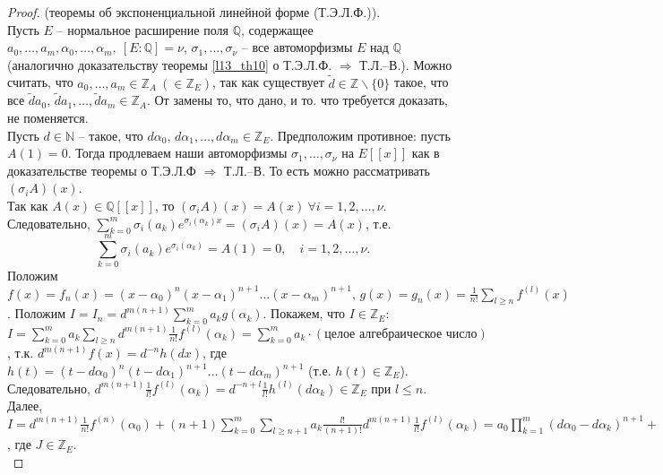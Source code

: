 \begin{proof} (теоремы об экспоненциальной линейной форме (Т.Э.Л.Ф.)).\\
	Пусть $E$ -- нормальное расширение поля $\mathbb{Q}$, содержащее $a_0,\dots,a_m,\alpha_0,\dots,\alpha_m, \ [E \colon \mathbb{Q}] = \nu$, $\sigma_1,\dots,\sigma_\nu$ -- все автоморфизмы $E$ над $\mathbb{Q}$ (аналогично доказательству теоремы \ref{l13_th10} о Т.Э.Л.Ф. $\Rightarrow$ Т.Л.--В.). 
	Можно считать, что $a_0, \dots, a_m \in \mathbb{Z}_A \ (\in \mathbb{Z}_E)$, так как существует $\tilde{d} \in \mathbb{Z} \backslash \{ 0 \}$ такое, что все $\tilde{d}a_0, \, \tilde{d}a_1, \dots, \tilde{d}a_m \in \mathbb{Z}_A$. От замены то, что дано, и то. что требуется доказать, не поменяется.\\
	Пусть $d \in \mathbb{N}$ -- такое, что $d\alpha_0, \, d\alpha_1, \dots, d\alpha_m \in \mathbb{Z}_E$. Предположим противное: пусть $A(1)=0$. Тогда продлеваем наши автоморфизмы $\sigma_1, \dots, \sigma_\nu$ на $E[[x]]$ как в доказательстве теоремы о Т.Э.Л.Ф $\Rightarrow$ Т.Л.--В. То есть можно рассматривать $(\sigma_iA)(x)$.\\
	Так как $A(x) \in \mathbb{Q}[[x]]$, то $(\sigma_iA)(x) = A(x) \ \forall i = 1,2,\dots,\nu$. Следовательно, $\displaystyle \sum\limits_{k=0}^m \sigma_i (a_k) e^{\sigma_i(\alpha_k)x} = (\sigma_iA)(x) = A(x)$, т.е.
	$$\sum\limits_{k=0}^m \sigma_i(a_k)e^{\sigma_i(\alpha_k)} = A(1) = 0, \quad i = 1,2,\dots,\nu.$$
	Положим $\displaystyle f(x) = f_n(x) = (x-\alpha_0)^n(x-\alpha_1)^{n+1}\dots(x-\alpha_m)^{n+1}, \, g(x) = g_n(x) = \frac{1}{n!} \sum\limits_{l \geq n} f^{(l)}(x)$. 
	Положим $\displaystyle I=I_n = d^{m(n+1)} \sum\limits_{k=0}^m a_kg(\alpha_k)$. Покажем, что $I \in \mathbb{Z}_E$:\\
	$\displaystyle I = \sum\limits_{k=0}^m a_k \sum\limits_{l \geq n} d^{m(n+1)}\frac{1}{n!}f^{(l)}(\alpha_k) = \sum\limits_{k=0}^m a_k \cdot (\text{целое алгебраическое число})$, т.к. $d^{m(n+1)}f(x) = d^{-n}h(dx)$, где $h(t) = (t-d\alpha_0)^n(t-d\alpha_1)^{n+1}\dots(t-d\alpha_m)^{n+1}$ (т.е. $h(t) \in \mathbb{Z}_E$). 
	Следовательно, $\displaystyle d^{m(n+1)}\frac{1}{l!}f^{(l)}(\alpha_k) = d^{-n+l}\frac{1}{l!}h^{(l)}(d\alpha_k) \in \mathbb{Z}_E$ при $l \leq n$. Далее,\\
	$\displaystyle I = d^{m(n+1)}\frac{1}{n!}f^{(n)}(\alpha_0) + (n+1)\sum\limits_{k=0}^m\sum\limits_{l \geq n+1} a_k\frac{l!}{(n+1)!}d^{m(n+1)}\frac{1}{l!}f^{(l)}(\alpha_k) = a_0\prod\limits_{k=1}^m (d\alpha_0-d\alpha_k)^{n+1} + (n+1)J$, где $J \in \mathbb{Z}_E$.\\

\end{proof}
